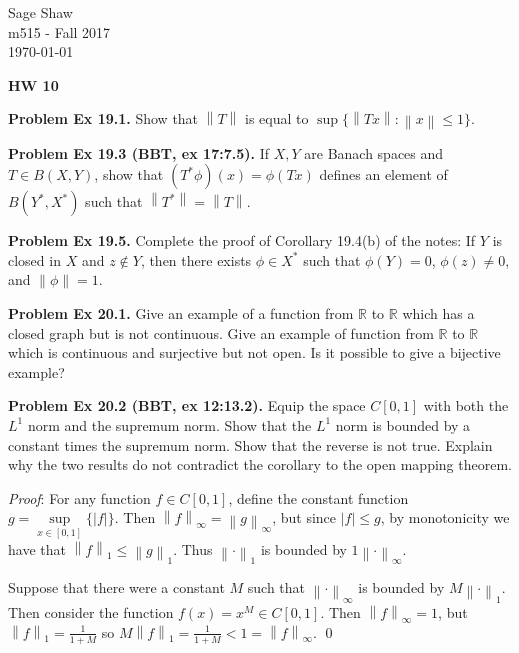 \documentclass[12pt]{article}
\newcommand{\problem}[1]{\hspace{-4 ex} \large \textbf{Problem #1} }
\newcommand{\norm}[1]{\left\lVert#1\right\rVert}
\renewenvironment{proof}{\hspace{-4 ex} \emph{Proof}:}{\qed}
\newcommand{\RR}{\mathbb{R}}
\begin{document}
	\thispagestyle{empty}
	
	\begin{flushright}
		Sage Shaw \\
		m515 - Fall 2017 \\
		\today
	\end{flushright}
	
{\large \textbf{HW 10}}\bigbreak

\problem{Ex 19.1.} Show that $\norm{T}$ is equal to $\sup\{\norm{Tx}:\norm{x}\leq1\}$. \bigbreak


\bigbreak
\problem{Ex 19.3 (BBT, ex 17:7.5).} If $X,Y$ are Banach spaces and $T\in B(X,Y)$, show that $(T^*\phi)(x)=\phi(Tx)$ defines an element of $B(Y^*,X^*)$ such that $\norm{T^*}=\norm{T}$. \bigbreak

\bigbreak
\problem{Ex 19.5.} Complete the proof of Corollary 19.4(b) of the notes: If $Y$ is closed in $X$ and $z\notin Y$, then there exists $\phi\in X^*$ such that $\phi(Y)=0$, $\phi(z)\neq0$, and $\norm{\phi}=1$. \bigbreak

\bigbreak
\problem{Ex 20.1.} Give an example of a function from $\RR$ to $\RR$ which has a closed graph but is not continuous. Give an example of function from $\RR$ to $\RR$ which is continuous and surjective but not open. Is it possible to give a bijective example? \bigbreak


\bigbreak
\problem{Ex 20.2 (BBT, ex 12:13.2).} Equip the space $C[0,1]$ with both the $L^1$ norm and the supremum norm. Show that the $L^1$ norm is bounded by a constant times the supremum norm. Show that the reverse is not true. Explain why the two results do not contradict the corollary to the open mapping theorem. \bigbreak

	\begin{proof}
		For any function $f \in C[0,1]$, define the constant function $g = \sup\limits_{x \in [0,1]}\{\vert f \vert \}$. Then $\norm{f}_\infty = \norm{g}_\infty$, but since $\vert f \vert  \leq g$, by monotonicity we have that $\norm{f}_1 \leq \norm{g}_1$. Thus $\norm{\cdot}_1$ is bounded by $1\norm{\cdot}_\infty$. \bigbreak
		
		Suppose that there were a constant $M$ such that $\norm{\cdot}_\infty$ is bounded by $M\norm{\cdot}_1$. Then consider the function $f(x) = x^{M} \in C[0,1]$. Then $\norm{f}_\infty = 1$, but $\norm{f}_1 = \tfrac{1}{1+M}$ so $M \norm{f}_1 = \tfrac{1}{1+M} < 1 = \norm{f}_\infty$.
	\end{proof}
\end{document}
